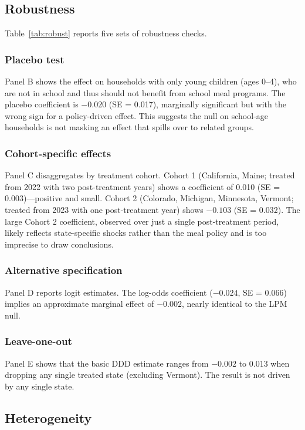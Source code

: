 \documentclass[12pt]{article}
\begin{document}
\subsection{Robustness}

Table~\ref{tab:robust} reports five sets of robustness checks.

\subsubsection*{Placebo test} Panel B shows the effect on households with only young children (ages 0--4), who are not in school and thus should not benefit from school meal programs. The placebo coefficient is $-0.020$ (SE = 0.017), marginally significant but with the wrong sign for a policy-driven effect. This suggests the null on school-age households is not masking an effect that spills over to related groups.

\subsubsection*{Cohort-specific effects} Panel C disaggregates by treatment cohort. Cohort 1 (California, Maine; treated from 2022 with two post-treatment years) shows a coefficient of 0.010 (SE = 0.003)---positive and small. Cohort 2 (Colorado, Michigan, Minnesota, Vermont; treated from 2023 with one post-treatment year) shows $-0.103$ (SE = 0.032). The large Cohort 2 coefficient, observed over just a single post-treatment period, likely reflects state-specific shocks rather than the meal policy and is too imprecise to draw conclusions.

\subsubsection*{Alternative specification} Panel D reports logit estimates. The log-odds coefficient ($-0.024$, SE = 0.066) implies an approximate marginal effect of $-0.002$, nearly identical to the LPM null.

\subsubsection*{Leave-one-out} Panel E shows that the basic DDD estimate ranges from $-0.002$ to $0.013$ when dropping any single treated state (excluding Vermont). The result is not driven by any single state.



\subsection{Heterogeneity}
\end{document}
